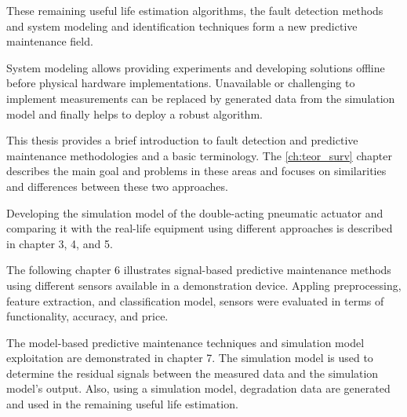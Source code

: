 These remaining useful life estimation algorithms, the fault detection
methods and system modeling and identification techniques form a new
predictive maintenance field.

System modeling allows providing experiments and developing solutions
offline before physical hardware implementations. Unavailable or
challenging to implement measurements can be replaced by generated data
from the simulation model and finally helps to deploy a robust algorithm.

This thesis provides a brief introduction to fault detection and predictive
maintenance methodologies and a basic terminology. 
The \ref{ch:teor_surv} chapter describes the main goal and problems
in these areas and focuses on similarities and differences between these
two approaches.

Developing the simulation model of the double-acting pneumatic actuator and
comparing it with the real-life equipment using different approaches is
described in chapter 3, 4, and 5. 

The following chapter 6 illustrates signal-based predictive maintenance
methods using different sensors available in a demonstration device.
Appling preprocessing, feature extraction, and classification model,
sensors were evaluated in terms of functionality, accuracy, and price. 

The model-based predictive maintenance techniques and simulation model
exploitation are demonstrated in chapter 7. The simulation model is used to
determine the residual signals between the measured data and the simulation
model's output. Also, using a simulation model, degradation data are
generated and used in the remaining useful life estimation.

